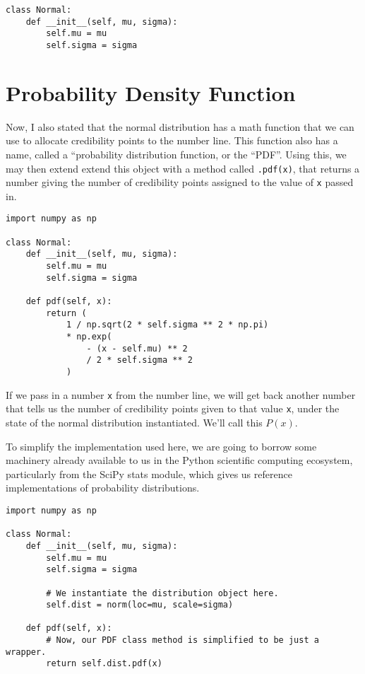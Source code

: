 \begin{lstlisting}
class Normal:
    def __init__(self, mu, sigma):
        self.mu = mu
        self.sigma = sigma
\end{lstlisting}

\section{Probability Density Function}

Now, I also stated that the normal distribution has a math function that we can use to allocate credibility points to the number line. This function also has a name, called a ``probability distribution function, or the ``PDF''. Using this, we may then extend extend this object with a method called \lstinline{.pdf(x)}, that returns a number giving the number of credibility points assigned to the value of \lstinline{x} passed in.

\begin{lstlisting}
import numpy as np

class Normal:
    def __init__(self, mu, sigma):
        self.mu = mu
        self.sigma = sigma

    def pdf(self, x):
        return (
            1 / np.sqrt(2 * self.sigma ** 2 * np.pi)
            * np.exp(
                - (x - self.mu) ** 2
                / 2 * self.sigma ** 2
            )
\end{lstlisting}
If we pass in a number \lstinline{x} from the number line, we will get back another number that tells us the number of credibility points given to that value \lstinline{x}, under the state of the normal distribution instantiated. We'll call this $P(x)$.

To simplify the implementation used here, we are going to borrow some machinery already available to us in the Python scientific computing ecosystem, particularly from the SciPy stats module, which gives us reference implementations of probability distributions.

\begin{lstlisting}
import numpy as np

class Normal:
    def __init__(self, mu, sigma):
        self.mu = mu
        self.sigma = sigma

        # We instantiate the distribution object here.
        self.dist = norm(loc=mu, scale=sigma)

    def pdf(self, x):
        # Now, our PDF class method is simplified to be just a wrapper.
        return self.dist.pdf(x)
\end{lstlisting}

